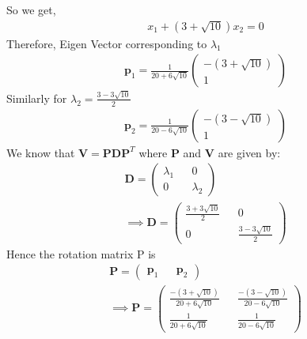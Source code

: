 \documentclass[journal,13pt,twocolumn]{IEEEtran}
\newcommand{\myvec}[1]{\ensuremath{\begin{pmatrix}#1\end{pmatrix}}}
\renewcommand{\vec}[1]{\mathbf{#1}}
\begin{document}
So we get,
\begin{align}
x_1 + (3+\sqrt{10})x_2 = 0
\end{align}
Therefore, Eigen Vector corresponding to $\lambda_1$
\begin{align}
\vec{p}_1 =\frac{1}{20+6\sqrt{10}} \myvec{-(3+\sqrt{10}) \\ 1}
\end{align}
Similarly for $\lambda_2 = \frac{3-3\sqrt{10}}{2}$
\begin{align}
\vec{p}_2 =\frac{1}{20-6\sqrt{10}} \myvec{-(3-\sqrt{10}) \\ 1}
\end{align}
We know that $\vec{V} = \vec{P}\vec{D}\vec{P}^T$ where $\vec{P}$ and $\vec{V}$ are given by:
\begin{align}
\vec{D} = \myvec{\lambda_1 && 0\\ 0 && \lambda_2}\\
\implies \vec{D} = \myvec{\frac{3+3\sqrt{10}}{2} && 0\\ 0 &&\frac{3-3\sqrt{10}}{2} }
\end{align}
Hence the rotation matrix P is
\begin{align}
\vec{P} = \myvec{\vec{p}_1 && \vec{p}_2}\\
\implies \vec{P} = \myvec{\frac{-(3+\sqrt{10})}{20+6\sqrt{10}} && \frac{-(3-\sqrt{10})}{20-6\sqrt{10}} \\ \frac{1}{20+6\sqrt{10}} && \frac{1}{20-6\sqrt{10}}}
\end{align}
\end{document}
